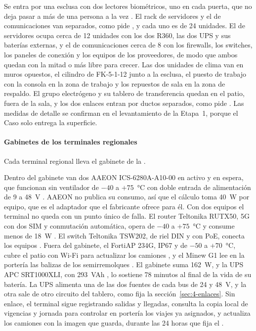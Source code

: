 Se entra por una esclusa con dos lectores biométricos, uno en cada puerta, que no deja pasar a más de
una persona a la vez . El rack de servidores y el de comunicaciones van separados,
como pide , y cada uno es de 24 unidades. El de servidores ocupa cerca de 12
unidades con los dos R360, las dos UPS y sus baterías externas, y el de comunicaciones cerca de 8 con
los firewalls, los switches, los paneles de conexión y los equipos de los proveedores, de modo que ambos
quedan con la mitad o más libre para crecer. Las dos unidades de clima van en muros opuestos, el cilindro
de FK-5-1-12 junto a la esclusa, el puesto de trabajo con la consola en la zona de trabajo y los
repuestos de sala en la zona de respaldo. El grupo electrógeno y su tablero de transferencia quedan en
el patio, fuera de la sala, y los dos enlaces entran por ductos separados, como pide
. Las medidas de detalle se confirman en el levantamiento de la Etapa~1, porque el
Caso solo entrega la superficie.

\paragraph{Gabinetes de los terminales regionales} Cada terminal regional lleva el gabinete de la
.


Dentro del gabinete van dos AAEON ICS-6280A-A10-00 en activo y en espera, que funcionan sin ventilador de
$-40$ a $+75$~°C con doble entrada de alimentación de 9 a 48~V \parencite{aaeon_ics6280}. AAEON no publica
su consumo, así que el cálculo toma 40~W por equipo, que es el adaptador que el fabricante ofrece para él.
Con dos equipos el terminal no queda con un punto único de falla. El router Teltonika RUTX50, 5G con dos
SIM y conmutación automática, opera de $-40$ a $+75$~°C y consume menos de 18~W
\parencite{teltonika_rutx50}. El switch Teltonika TSW202, de riel DIN y con PoE, conecta los equipos
\parencite{teltonika_tsw202}. Fuera del gabinete, el FortiAP 234G, IP67 y de $-50$ a $+70$~°C, cubre el
patio con Wi-Fi para actualizar los camiones \parencite{fortinet_fap}, y el Minew G1 lee en la portería
las balizas de los semirremolques \parencite{minew_g1}. El gabinete suma 162~W, y la UPS APC SRT1000XLI,
con 293~VAh \parencite{apc_srt1000}, lo sostiene 78 minutos al final de la vida de su batería. La UPS
alimenta una de las dos fuentes de cada bus de 24 y 48~V, y la otra sale de otro circuito del tablero,
como fija la sección~\ref{sec:4-enlaces}. Sin enlace,
el terminal sigue registrando salidas y llegadas, consulta la copia local de vigencias y jornada para
controlar en portería los viajes ya asignados, y actualiza los camiones con la imagen que guarda, durante las 24 horas que fija el
.

